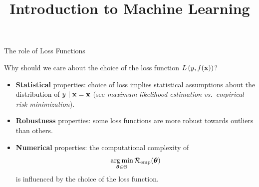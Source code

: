 \documentclass[11pt,compress,t,notes=noshow, xcolor=table]{beamer}
\title{Introduction to Machine Learning}
\begin{document}
    

\begin{vbframe}{The role of Loss Functions}

Why should we care about the choice of the loss function $L\left(y, f(\mathbf{x})\right)$?

\begin{itemize}
\item \textbf{Statistical} properties: choice of loss implies statistical assumptions about the distribution of $y ~|~ \mathbf{x} = \mathbf{x}$ (see \emph{maximum likelihood estimation vs.\
empirical risk minimization}). 
\item \textbf{Robustness} properties: some loss functions are more robust towards outliers than others. 
\item \textbf{Numerical} properties: the computational complexity of
$$
\operatorname*{arg\,min}_{\bm{\theta} \in \Theta} \mathcal{R}_{\text{emp}}(\bm{\theta})
$$
is influenced by the choice of the loss function. 
\end{itemize}

\end{vbframe}

\end{document}
